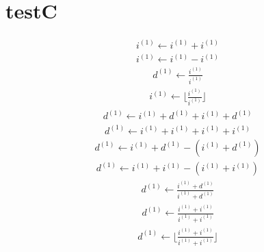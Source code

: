 \documentclass[a4paper,fleqn]{ltjsarticle}
\begin{document}
\section{testC}
  \begin{align}
  i^{(1)} \leftarrow i^{(1)}+i^{(1)}
  \end{align}
  \begin{align}
  i^{(1)} \leftarrow i^{(1)}-i^{(1)}
  \end{align}
  \begin{align}
  d^{(1)} \leftarrow \frac{\displaystyle i^{(1)}}{\displaystyle i^{(1)}}
  \end{align}
  \begin{align}
  i^{(1)} \leftarrow \lfloor \frac{\displaystyle i^{(1)}}{\displaystyle i^{(1)}}\rfloor
  \end{align}
  \begin{align}
  d^{(1)} \leftarrow i^{(1)}+d^{(1)}+i^{(1)}+d^{(1)}
  \end{align}
  \begin{align}
  d^{(1)} \leftarrow i^{(1)}+i^{(1)}+i^{(1)}+i^{(1)}
  \end{align}
  \begin{align}
  d^{(1)} \leftarrow i^{(1)}+d^{(1)}-\left(i^{(1)}+d^{(1)}\right)
  \end{align}
  \begin{align}
  d^{(1)} \leftarrow i^{(1)}+i^{(1)}-\left(i^{(1)}+i^{(1)}\right)
  \end{align}
  \begin{align}
  d^{(1)} \leftarrow \frac{\displaystyle i^{(1)}+d^{(1)}}{\displaystyle i^{(1)}+d^{(1)}}
  \end{align}
  \begin{align}
  d^{(1)} \leftarrow \frac{\displaystyle i^{(1)}+i^{(1)}}{\displaystyle i^{(1)}+i^{(1)}}
  \end{align}
  \begin{align}
  d^{(1)} \leftarrow \lfloor \frac{\displaystyle i^{(1)}+i^{(1)}}{\displaystyle i^{(1)}+i^{(1)}}\rfloor
  \end{align}
\end{document}
